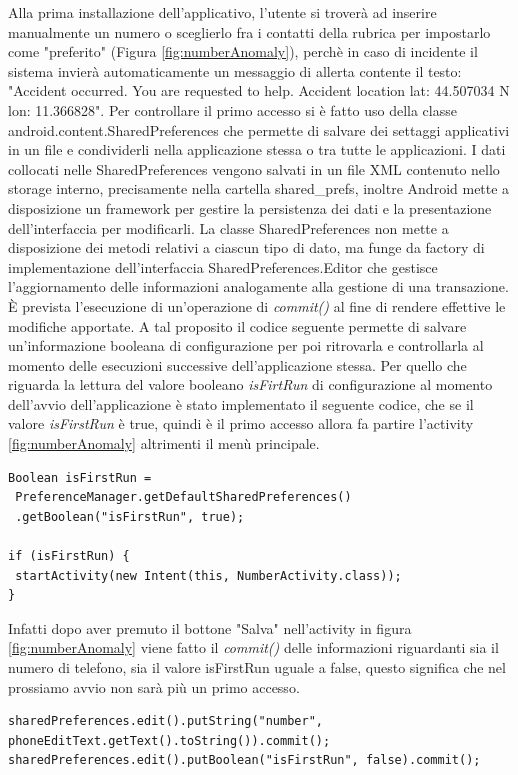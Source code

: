 \documentclass[a4paper, 11pt]{article} %
\begin{document}
Alla prima installazione dell'applicativo, l'utente si troverà ad inserire manualmente un numero o sceglierlo fra i contatti della rubrica per impostarlo come "preferito" (Figura \ref{fig:numberAnomaly}), perchè in caso di incidente il sistema invierà automaticamente un messaggio di allerta contente il testo: "Accident occurred. You are requested to help. Accident location lat: 44.507034 N lon: 11.366828". Per controllare il primo accesso si è fatto uso della classe android.content.SharedPreferences che permette di salvare dei settaggi applicativi in un file e condividerli nella applicazione stessa o tra tutte le applicazioni. I dati collocati nelle SharedPreferences vengono salvati in un file XML contenuto nello storage interno, precisamente nella cartella shared\_prefs, inoltre Android mette a disposizione un framework per gestire la persistenza dei dati e la presentazione dell'interfaccia per modificarli.
La classe SharedPreferences non mette a disposizione dei metodi relativi a ciascun tipo di dato, ma funge da factory di implementazione dell'interfaccia SharedPreferences.Editor che gestisce l'aggiornamento delle informazioni analogamente alla gestione di una transazione. È prevista l'esecuzione di un'operazione di \textit{commit()} al fine di rendere effettive le modifiche apportate. A tal proposito il codice seguente permette di salvare un'informazione booleana di configurazione per poi ritrovarla e controllarla al momento delle esecuzioni successive dell'applicazione stessa. Per quello che riguarda la lettura del valore booleano \textit{isFirtRun} di configurazione al momento dell'avvio dell'applicazione è stato implementato il seguente codice, che se il valore \textit{isFirstRun} è true, quindi è il primo accesso allora fa partire l'activity \ref{fig:numberAnomaly} altrimenti il menù principale.
\begin{lstlisting}
Boolean isFirstRun =  
 PreferenceManager.getDefaultSharedPreferences()
 .getBoolean("isFirstRun", true);

if (isFirstRun) {
 startActivity(new Intent(this, NumberActivity.class));
}
\end{lstlisting}
Infatti dopo aver premuto il bottone "Salva" nell'activity in figura \ref{fig:numberAnomaly} viene fatto il \textit{commit()} delle informazioni riguardanti sia il numero di telefono, sia il valore isFirstRun uguale a false, questo significa che nel prossiamo avvio non sarà più un primo accesso.
\begin{lstlisting}
sharedPreferences.edit().putString("number", phoneEditText.getText().toString()).commit();
sharedPreferences.edit().putBoolean("isFirstRun", false).commit();
\end{lstlisting}
\end{document}
